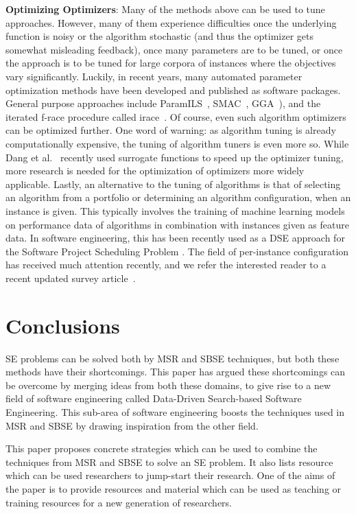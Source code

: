\documentclass[sigconf]{acmart}
\begin{document}
\noindent\textbf{Optimizing Optimizers}: %
Many of the methods above can be used to tune approaches. However, many of them experience difficulties once the underlying function is noisy or the algorithm stochastic (and thus the optimizer gets somewhat misleading feedback), once many parameters are to be tuned, or once the approach is to be tuned for large corpora of instances where the objectives vary significantly. Luckily, in recent years, many automated parameter optimization methods have been developed and published as software packages. General purpose approaches include ParamILS~\cite{hutter2007paramils}, SMAC~\cite{hutter2011smac}, GGA~\cite{ansotegui2009gga}), and the iterated f-race procedure called irace~\cite{birattari2002irace}. %
Of course, even such algorithm optimizers can be optimized further. One word of warning: as algorithm tuning is already computationally expensive, the tuning of algorithm tuners is even more so. While Dang et al.~\cite{dang2017iraceconfig} recently used surrogate functions to speed up the optimizer tuning, more research is needed for the optimization of optimizers more widely applicable. Lastly, an alternative to the tuning of algorithms is that of selecting an algorithm from a portfolio or determining an algorithm configuration, when an instance is given. This typically involves the training of machine learning models on performance data of algorithms in combination with instances given as feature data. {In software engineering, this has been recently used as a DSE approach for the Software Project Scheduling Problem \cite{Shen2018,wu2016}.} The field of per-instance configuration has received much attention recently, and we refer the interested reader to a recent updated survey article~\cite{kotthoff2016survey}. 


\section{Conclusions}
SE problems can be solved both by MSR and SBSE techniques, but both these methods have their shortcomings. This paper has argued these shortcomings can be overcome by merging ideas from both these domains, to give rise to a new field of software engineering called Data-Driven Search-based Software Engineering. This sub-area of software engineering boosts the techniques used in MSR and SBSE by drawing inspiration from the other field. 

This paper proposes concrete strategies which can be used to combine the techniques from MSR and SBSE to solve an SE problem. It also lists resource which can be used researchers to jump-start their research. One of the aims of the paper is to provide resources and material which can be used as teaching or training resources for a new generation of researchers. 
\end{document}

